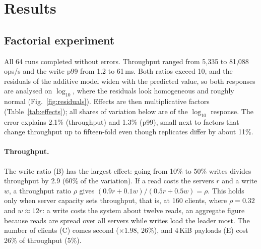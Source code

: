 \documentclass{llncs}
\begin{document}
\section{Results}

\subsection{Factorial experiment}
\label{sec:factorial}

All 64 runs completed without errors. Throughput ranged from 5{,}335 to 81{,}088 ops/s and the write p99 from 1.2 to 61\,ms. Both ratios exceed 10, and the residuals of the additive model widen with the predicted value, so both responses are analysed on $\log_{10}$, where the residuals look homogeneous and roughly normal (Fig.~\ref{fig:residuals}). Effects are then multiplicative factors (Table~\ref{tab:effects}); all shares of variation below are of the $\log_{10}$ response. The error explains 2.1\% (throughput) and 1.3\% (p99), small next to factors that change throughput up to fifteen-fold even though replicates differ by about 11\%.

\begin{table}[t]
  \centering
  \caption{Largest effects ($\log_{10}$ model; all 31 in Appendix~\ref{app:effects}): $q$, the factor ($\times$) from the low to the high level, the 95\%
    interval of $q$ and the share of the variation (\%). $^\dagger$: interval includes zero.}
  \label{tab:effects}
  \scriptsize
  \setlength{\tabcolsep}{3pt}
  
\end{table}

\paragraph{Throughput.} The write ratio (B) has the largest effect: going from 10\% to 50\% writes divides throughput by 2.9 (60\% of the variation). If a read costs the servers $r$ and a write $w$, a throughput ratio $\rho$ gives $(0.9r+0.1w)/(0.5r+0.5w)=\rho$. This holds only when server capacity sets throughput, that is, at 160 clients, where $\rho=0.32$ and $w\approx12r$: a write costs the system about twelve reads, an aggregate figure because reads are spread over all servers while writes load the leader most. The number of clients (C) comes second ($\times1.98$, 26\%), and 4\,KiB payloads (E) cost 26\% of throughput (5\%).
\end{document}
